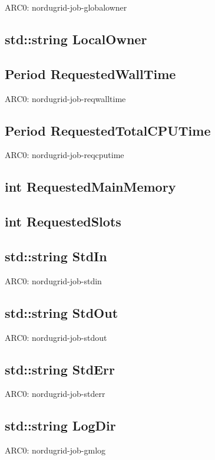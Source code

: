 \documentclass{book}
\begin{document}
ARC0: nordugrid-job-globalowner

\subsection*{std::string LocalOwner}

\subsection*{Period RequestedWallTime}

ARC0: nordugrid-job-reqwalltime

\subsection*{Period RequestedTotalCPUTime}

ARC0: nordugrid-job-reqcputime

\subsection*{int RequestedMainMemory}

\subsection*{int RequestedSlots}

\subsection*{std::string StdIn}

ARC0: nordugrid-job-stdin

\subsection*{std::string StdOut}

ARC0: nordugrid-job-stdout

\subsection*{std::string StdErr}

ARC0: nordugrid-job-stderr

\subsection*{std::string LogDir}

ARC0: nordugrid-job-gmlog
\end{document}
